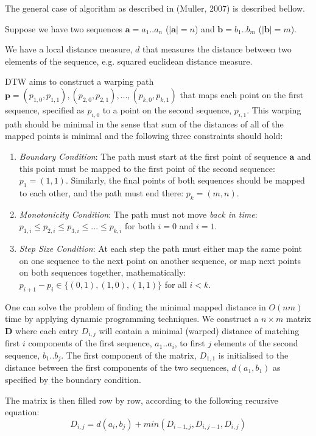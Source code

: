 \documentclass[12pt,a4paper]{article}
\begin{document}
The general case of algorithm as described in (Muller, 2007) \cite{Muller:2007bo} is described bellow.

Suppose we have two sequences $\mathbf{a} = a_1..a_n$ ($|\mathbf{a}| = n$) and $\mathbf{b} = b_1..b_m$ ($|\mathbf{b}| = m$).

We have a local distance measure, $d$ that measures the distance between two elements of the sequence, e.g. squared euclidean distance measure.

DTW aims to construct a warping path $\mathbf{p} = { (p_{1,0}, p_{1,1}), (p_{2,0}, p_{2,1}), ..., (p_{k,0}, p_{k, 1}) }$ that maps each point on the first sequence, specified as $p_{i,0}$ to a point on the second sequence, $p_{i,1}$. This warping path should be minimal in the sense that sum of the distances of all of the mapped points is minimal and the following three constraints should hold\cite{Muller:2007bo}:
\begin{enumerate}
\item \emph{Boundary Condition}: The path must start at the first point of sequence $\mathbf{a}$ and this point must be mapped to the first point of the second sequence: $p_1 = (1,1)$. Similarly, the final points of both sequences should be mapped to each other, and the path must end there: $p_k = (m, n).$ 
\item \emph{Monotonicity Condition}: The path must not move \emph{back in time}: 
    $p_{1,i} \le p_{2,i} \le p_{3,i} \le ... \le p_{k, i}$ for both $i=0$ and $i=1$.
\item \emph{Step Size Condition}: At each step the path must either map the same point on one sequence to the next point on another sequence, or map next points on both sequences together, mathematically:
    $p_{i+1} - p_{i} \in \{(0,1), (1,0), (1,1)\}$ for all $i < k$.
\end{enumerate}

One can solve the problem of finding the minimal mapped distance in $O(nm)$ time by applying dynamic programming techniques. We construct a $n \times m$ matrix $\mathbf{D}$ where each entry $D_{i,j}$ will contain a minimal (warped) distance of matching first $i$ components of the first sequence, $a_1..a_i$, to first $j$ elements of the second sequence, $b_1..b_j$. The first component of the matrix, $D_{1,1}$ is initialised to the distance between the first components of the two sequences, $d(a_1, b_1)$ as specified by the boundary condition.

The matrix is then filled row by row, according to the following recursive equation:
$$D_{i,j} = d(a_i, b_j) + min(D_{i-1, j}, D_{i, j-1}, D_{i,j})$$
\end{document}
